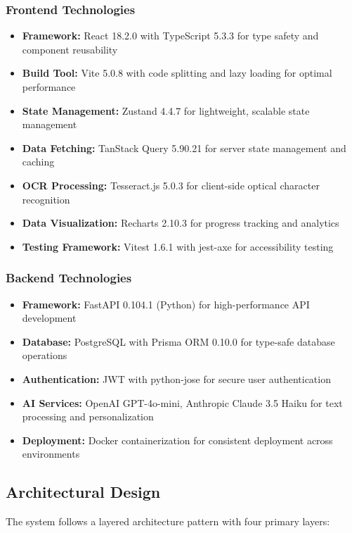 \documentclass[journal]{IEEEtran}
\begin{document}
\subsubsection{Frontend Technologies}
\begin{itemize}
    \item \textbf{Framework:} React 18.2.0 with TypeScript 5.3.3 for type safety and component reusability
    \item \textbf{Build Tool:} Vite 5.0.8 with code splitting and lazy loading for optimal performance
    \item \textbf{State Management:} Zustand 4.4.7 for lightweight, scalable state management
    \item \textbf{Data Fetching:} TanStack Query 5.90.21 for server state management and caching
    \item \textbf{OCR Processing:} Tesseract.js 5.0.3 for client-side optical character recognition
    \item \textbf{Data Visualization:} Recharts 2.10.3 for progress tracking and analytics
    \item \textbf{Testing Framework:} Vitest 1.6.1 with jest-axe for accessibility testing
\end{itemize}

\subsubsection{Backend Technologies}
\begin{itemize}
    \item \textbf{Framework:} FastAPI 0.104.1 (Python) for high-performance API development
    \item \textbf{Database:} PostgreSQL with Prisma ORM 0.10.0 for type-safe database operations
    \item \textbf{Authentication:} JWT with python-jose for secure user authentication
    \item \textbf{AI Services:} OpenAI GPT-4o-mini, Anthropic Claude 3.5 Haiku for text processing and personalization
    \item \textbf{Deployment:} Docker containerization for consistent deployment across environments
\end{itemize}

\subsection{Architectural Design}

The system follows a layered architecture pattern with four primary layers:
\end{document}
